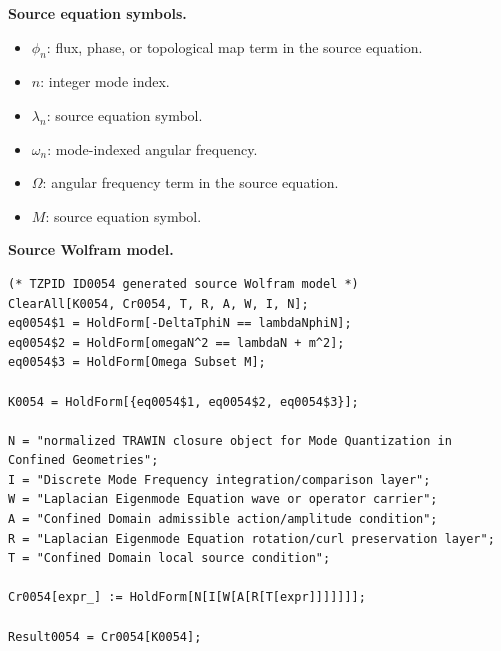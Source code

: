 \begin{minipage}[t]{0.49\linewidth}
\begingroup
\small
\raggedright
\textbf{Source equation symbols.}\par
\begin{itemize}[leftmargin=1.35em,itemsep=1pt,topsep=1pt,parsep=0pt]
    \item $\phi_{n}$: flux, phase, or topological map term in the source equation.
    \item $n$: integer mode index.
    \item $\lambda_{n}$: source equation symbol.
    \item $\omega_{n}$: mode-indexed angular frequency.
    \item $\Omega$: angular frequency term in the source equation.
    \item $M$: source equation symbol.
\end{itemize}
\endgroup
\end{minipage}\hfill
\begin{minipage}[t]{0.47\linewidth}
\begingroup
\scriptsize
\raggedright
\textbf{Source Wolfram model.}\par
\begin{Verbatim}[fontsize=\tiny,breaklines=true,breakanywhere=true]
(* TZPID ID0054 generated source Wolfram model *)
ClearAll[K0054, Cr0054, T, R, A, W, I, N];
eq0054$1 = HoldForm[-DeltaTphiN == lambdaNphiN];
eq0054$2 = HoldForm[omegaN^2 == lambdaN + m^2];
eq0054$3 = HoldForm[Omega Subset M];

K0054 = HoldForm[{eq0054$1, eq0054$2, eq0054$3}];

N = "normalized TRAWIN closure object for Mode Quantization in Confined Geometries";
I = "Discrete Mode Frequency integration/comparison layer";
W = "Laplacian Eigenmode Equation wave or operator carrier";
A = "Confined Domain admissible action/amplitude condition";
R = "Laplacian Eigenmode Equation rotation/curl preservation layer";
T = "Confined Domain local source condition";

Cr0054[expr_] := HoldForm[N[I[W[A[R[T[expr]]]]]]];

Result0054 = Cr0054[K0054];
\end{Verbatim}
\endgroup
\end{minipage}

